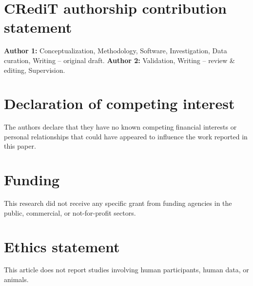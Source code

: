 
\section*{CRediT authorship contribution statement}
\textbf{Author 1:} Conceptualization, Methodology, Software, Investigation,
Data curation, Writing -- original draft. \textbf{Author 2:} Validation,
Writing -- review \& editing, Supervision. %

\section*{Declaration of competing interest}
The authors declare that they have no known competing financial interests
or personal relationships that could have appeared to influence the work
reported in this paper.

\section*{Funding}
This research did not receive any specific grant from funding agencies in
the public, commercial, or not-for-profit sectors. %

\section*{Ethics statement}
This article does not report studies involving human participants, human
data, or animals.

